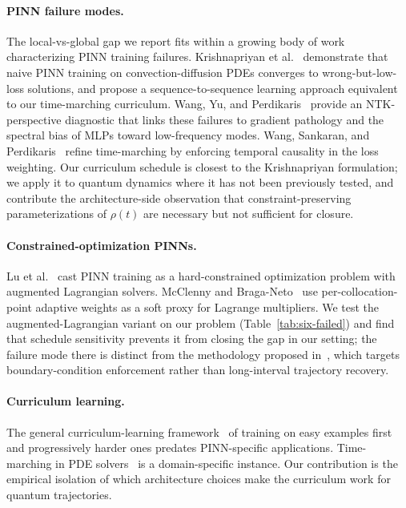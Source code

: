 \documentclass[11pt]{article}
\begin{document}
\paragraph{PINN failure modes.}
The local-vs-global gap we report fits within a growing body of work characterizing PINN training failures. Krishnapriyan et al.~\cite{krishnapriyan2021failure} demonstrate that naive PINN training on convection-diffusion PDEs converges to wrong-but-low-loss solutions, and propose a sequence-to-sequence learning approach equivalent to our time-marching curriculum. Wang, Yu, and Perdikaris~\cite{wang2022nonregression} provide an NTK-perspective diagnostic that links these failures to gradient pathology and the spectral bias of MLPs toward low-frequency modes. Wang, Sankaran, and Perdikaris~\cite{wang2024causality} refine time-marching by enforcing temporal causality in the loss weighting. Our curriculum schedule is closest to the Krishnapriyan formulation; we apply it to quantum dynamics where it has not been previously tested, and contribute the architecture-side observation that constraint-preserving parameterizations of $\rho(t)$ are necessary but not sufficient for closure.

\paragraph{Constrained-optimization PINNs.}
Lu et al.~\cite{lu2021hard} cast PINN training as a hard-constrained optimization problem with augmented Lagrangian solvers. McClenny and Braga-Neto~\cite{mcclenny2022sapinn} use per-collocation-point adaptive weights as a soft proxy for Lagrange multipliers. We test the augmented-Lagrangian variant on our problem (Table~\ref{tab:six-failed}) and find that schedule sensitivity prevents it from closing the gap in our setting; the failure mode there is distinct from the methodology proposed in~\cite{lu2021hard}, which targets boundary-condition enforcement rather than long-interval trajectory recovery.

\paragraph{Curriculum learning.}
The general curriculum-learning framework~\cite{bengio2009curriculum} of training on easy examples first and progressively harder ones predates PINN-specific applications. Time-marching in PDE solvers~\cite{krishnapriyan2021failure,wang2024causality} is a domain-specific instance. Our contribution is the empirical isolation of which architecture choices make the curriculum work for quantum trajectories.
\end{document}
